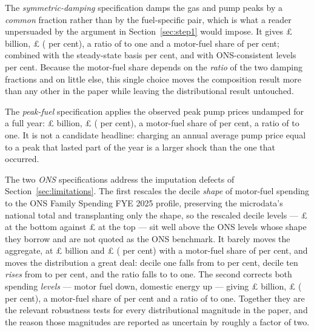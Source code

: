 The \emph{symmetric-damping} specification damps the gas and pump peaks by a \emph{common} fraction rather than by the fuel-specific pair, which is what a reader unpersuaded by the argument in Section~\ref{sec:step1} would impose. It gives \pounds \genSymDampAggBn{} billion, \pounds \genSymDampLossMean{} (\genSymDampLossPctIncome{} per cent), a ratio of \genSymDampDecileRatioPct{} to one and a motor-fuel share of \genSymDampMotorFuelShareOfLoss{} per cent; combined with the steady-state basis \genSymDampSteadyMotorFuelShare{} per cent, and with ONS-consistent levels \genSymDampOnsLevelsMotorFuelShare{} per cent. Because the motor-fuel share depends on the \emph{ratio} of the two damping fractions and on little else, this single choice moves the composition result more than any other in the paper while leaving the distributional result untouched.

The \emph{peak-fuel} specification applies the observed peak pump prices undamped for a full year: \pounds \genPeakFuelAggBn{} billion, \pounds \genPeakFuelLossMean{} (\genPeakFuelLossPctIncome{} per cent), a motor-fuel share of \genPeakFuelMotorFuelShareOfLoss{} per cent, a ratio of \genPeakFuelDecileRatioPct{} to one. It is not a candidate headline: charging an annual average pump price equal to a peak that lasted part of the year is a larger shock than the one that occurred.

The two \emph{ONS} specifications address the imputation defects of Section~\ref{sec:limitations}. The first rescales the decile \emph{shape} of motor-fuel spending to the ONS Family Spending FYE 2025 profile, preserving the microdata's national total and transplanting only the shape, so the rescaled decile levels --- \pounds \genRescaledFuelDecileOneGbp{} at the bottom against \pounds \genRescaledFuelDecileTenGbp{} at the top --- sit well above the ONS levels whose shape they borrow and are not quoted as the ONS benchmark. It barely moves the aggregate, at \pounds \genOnsFuelAggBn{} billion and \pounds \genOnsFuelLossMean{} (\genOnsFuelLossPctIncome{} per cent) with a motor-fuel share of \genOnsFuelMotorFuelShareOfLoss{} per cent, and moves the distribution a great deal: decile one falls from \genDecileOneLossPct{} to \genOnsFuelDecileOneLossPct{} per cent, decile ten \emph{rises} from \genDecileTenLossPct{} to \genOnsFuelDecileTenLossPct{} per cent, and the ratio falls to \genOnsFuelDecileRatioPct{} to one. The second corrects both spending \emph{levels} --- motor fuel down, domestic energy up --- giving \pounds \genOnsLevelsAggBn{} billion, \pounds \genOnsLevelsLossMean{} (\genOnsLevelsLossPctIncome{} per cent), a motor-fuel share of \genOnsLevelsMotorFuelShareOfLoss{} per cent and a ratio of \genOnsLevelsDecileRatioPct{} to one. Together they are the relevant robustness tests for every distributional magnitude in the paper, and the reason those magnitudes are reported as uncertain by roughly a factor of two.

